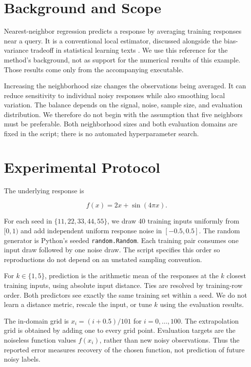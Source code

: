 \documentclass[
  10pt,
  letterpaper,
]{article}
\begin{document}
\section{Background and Scope}\label{background-and-scope}

Nearest-neighbor regression predicts a response by averaging training
responses near a query. It is a conventional local estimator, discussed
alongside the bias-variance tradeoff in statistical learning texts
\citep{hastie2009}. We use this reference for the method's background,
not as support for the numerical results of this example. Those results
come only from the accompanying executable.

Increasing the neighborhood size changes the observations being
averaged. It can reduce sensitivity to individual noisy responses while
also smoothing local variation. The balance depends on the signal,
noise, sample size, and evaluation distribution. We therefore do not
begin with the assumption that five neighbors must be preferable. Both
neighborhood sizes and both evaluation domains are fixed in the script;
there is no automated hyperparameter search.

\section{Experimental Protocol}\label{experimental-protocol}

The underlying response is

\[
f(x) = 2x + \sin(4\pi x).
\]

For each seed in \(\{11,22,33,44,55\}\), we draw 40 training inputs
uniformly from \([0,1)\) and add independent uniform response noise in
\([-0.5,0.5]\). The random generator is Python's seeded
\texttt{random.Random}. Each training pair consumes one input draw
followed by one noise draw. The script specifies this order so
reproductions do not depend on an unstated sampling convention.

For \(k\in\{1,5\}\), prediction is the arithmetic mean of the responses
at the \(k\) closest training inputs, using absolute input distance.
Ties are resolved by training-row order. Both predictors see exactly the
same training set within a seed. We do not learn a distance metric,
rescale the input, or tune \(k\) using the evaluation results.

The in-domain grid is \(x_i=(i+0.5)/101\) for \(i=0,\ldots,100\). The
extrapolation grid is obtained by adding one to every grid point.
Evaluation targets are the noiseless function values \(f(x_i)\), rather
than new noisy observations. Thus the reported error measures recovery
of the chosen function, not prediction of future noisy labels.
\end{document}
